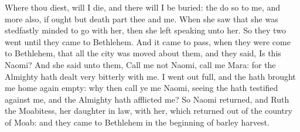 \begin{biblechapter}
\verse Where thou diest, will I die, and there will I be buried: the \LORD do so to me, and more also, if ought but death part thee and me.
\verse When she saw that she was stedfastly minded to go with her, then she left speaking unto her.
\verse So they two went until they came to Bethlehem. And it came to pass, when they were come to Bethlehem, that all the city was moved about them, and they said, Is this Naomi?
\verse And she said unto them, Call me not Naomi, call me Mara: for the Almighty hath dealt very bitterly with me.
\verse I went out full, and the \LORD hath brought me home again empty: why then call ye me Naomi, seeing the \LORD hath testified against me, and the Almighty hath afflicted me?
\verse So Naomi returned, and Ruth the Moabitess, her daughter in law, with her, which returned out of the country of Moab: and they came to Bethlehem in the beginning of barley harvest.
\end{biblechapter}


